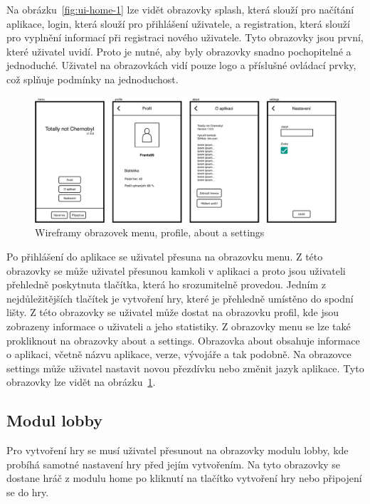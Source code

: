 Na obrázku~\ref{fig:ui-home-1} lze vidět obrazovky splash,
která slouží pro načítání aplikace,
login,
která slouží pro přihlášení uživatele,
a registration,
která slouží pro vyplnění informací při registraci nového uživatele.
Tyto obrazovky jsou první,
které uživatel uvidí.
Proto je nutné,
aby byly obrazovky snadno pochopitelné a jednoduché.
Uživatel na obrazovkách vidí pouze logo a příslušné ovládací prvky,
což splňuje podmínky na jednoduchost.  

\begin{figure}
    \centering
    \includegraphics[width=1\linewidth]{assets/design/wireframes/home-2.pdf}
    \caption{Wireframy obrazovek menu, profile, about a settings}
    \label{fig:ui-home-2}
\end{figure}

Po přihlášení do aplikace se uživatel přesuna na obrazovku menu.
Z této obrazovky se může uživatel přesunou kamkoli v aplikaci
a proto jsou uživateli přehledně poskytnuta tlačítka,
která ho srozumitelně provedou.
Jedním z nejdůležitějších tlačítek je vytvoření hry,
které je přehledně umístěno do spodní lišty.
Z této obrazovky se uživatel může dostat na obrazovku profil,
kde jsou zobrazeny informace o uživateli a jeho statistiky.
Z obrazovky menu se lze také prokliknout na obrazovky about a settings.
Obrazovka about obsahuje informace o aplikaci,
včetně názvu aplikace, verze, vývojáře a tak podobně.
Na obrazovce settings může uživatel nastavit novou přezdívku nebo změnit jazyk
aplikace.
Tyto obrazovky lze vidět na obrázku~\ref{fig:ui-home-2}.

\subsection{Modul lobby}

Pro vytvoření hry se musí uživatel přesunout na obrazovky modulu lobby,
kde probíhá samotné nastavení hry před jejím vytvořením.
Na tyto obrazovky se dostane hráč z modulu home po kliknutí na tlačítko
vytvoření hry nebo připojení se do hry.

